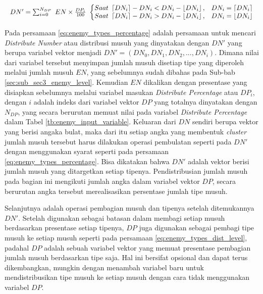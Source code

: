 \begin{equation}\label{eq:enemy_types_percentage}
\begin{split}
	\resizebox{\columnwidth}{!}{%
		$DN' = \sum_{i = 0}^{N_{DP}}\ EN \times \frac{DP_{i}}{100}\ 
		\left\{\begin{matrix} 
		Saat\ \left \lceil DN_{i} \right \rceil - DN_{i} < DN_{i} - \left \lfloor DN_{i} \right \rfloor, & DN_{i} = \left \lceil DN_{i} \right \rceil \\ 
		Saat\ \left \lceil DN_{i} \right \rceil - DN_{i} > DN_{i} - \left \lfloor DN_{i} \right \rfloor, & DN_{i} = \left \lfloor DN_{i} \right \rfloor
		\end{matrix}\right.$%
	}
\end{split}
\end{equation}

Pada persamaan \ref{eq:enemy_types_percentage} adalah persamaan untuk mencari \textit{Distribute Number} atau distribusi musuh yang dinyatakan dengan $DN'$ yang berupa variabel vektor menjadi $DN' = (DN_{0}, DN_{1}, DN_{2}, ..., DN_{i})$. Dimana nilai dari variabel tersebut menyimpan jumlah musuh disetiap tipe yang diperoleh melalui jumlah musuh $EN$, yang sebelumnya sudah dibahas pada Sub-bab \ref{sec:sub_sec3_enemy_level}. Kemudian $EN$ dikalikan dengan presentase yang disiapkan sebelumnya melalui variabel masukan \textit{Distribute Percentage} atau $DP_{i}$, dengan $i$ adalah indeks dari variabel vektor $DP$ yang totalnya dinyatakan dengan $N_{DP}$, yang secara berurutan memuat nilai pada variabel \textit{Distribute Percentage} dalam Tabel \ref{tb:enemy_input_variable}. Keluaran dari $DN$ sendiri berupa vektor yang berisi angaka bulat, maka dari itu setiap angka yang membentuk \textit{cluster} jumlah musuh tersebut harus dilakukan operasi pembulatan seperti pada $DN'$ dengan menggunakan syarat seperti pada persamaan \ref{eq:enemy_types_percentage}. Bisa dikatakan bahwa $DN'$ adalah vektor berisi jumlah musuh yang ditargetkan setiap tipenya. Pendistribusian jumlah musuh pada bagian ini mengikuti jumlah angka dalam variabel vektor $DP$, secara berurutan angka tersebut merealisasikan persentase jumlah tipe musuh.
\vspace{1ex}

Selanjutnya adalah operasi pembagian musuh dan tipenya setelah ditemukannya $DN'$. Setelah digunakan sebagai batasan dalam membagi setiap musuh berdasarkan presentase setiap tipenya, $DP$ juga digunakan sebagai pembagi tipe musuh ke setiap musuh seperti pada persamaan \ref{eq:enemy_types_dist_level}, padahal $DP$ adalah sebuah variabel vektor yang memuat presentase pembagian jumlah musuh berdasarkan tipe saja. Hal ini bersifat opsional dan dapat terus dikembangkan, mungkin dengan menambah variabel baru untuk mendistribusikan tipe musuh ke setiap musuh dengan cara tidak menggunakan variabel $DP$.
\vspace{1ex}

